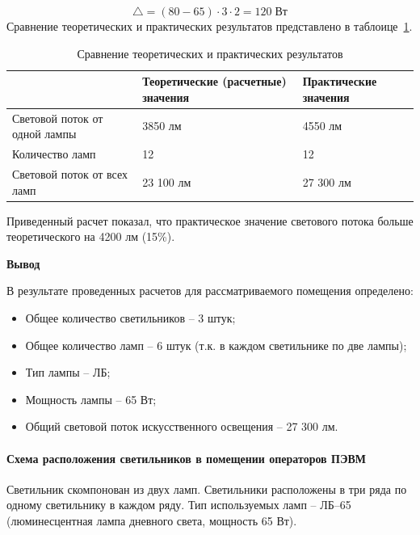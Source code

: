 \begin{enumerate}
$$ \triangle = (80 - 65) \cdot 3 \cdot 2 = 120 \; Вт$$
Сравнение теоретических и практических результатов представлено в таблоице~\ref{bzd:srav}.

 \begin{table}[htbp]
    \centering
    \caption{Сравнение теоретических и практических результатов}\label{bzd:srav}%
      \begin{tabular}{|p{4cm}|p{5cm}|p{5cm}|}
      \hline
       & \textbf{Теоретические (расчетные) значения} & \textbf{Практические значения} \\
      \hline
      Световой поток от одной лампы & 3850 лм & 4550 лм \\
      \hline
      Количество ламп & 12 & 12 \\
      \hline
      Световой поток от всех ламп & 23 100 лм & 27 300 лм \\
      \hline
      \end{tabular}%
    
  \end{table}%
  Приведенный расчет показал, что практическое значение светового потока больше теоретического на 4200 лм (15\%).
\end{enumerate}
 
  \textbf{Вывод}
  
  В результате проведенных расчетов для рассматриваемого помещения определено:
  \begin{itemize}
  \item Общее количество светильников – 3 штук;
  \item Общее количество ламп – 6 штук (т.к. в каждом светильнике по две лампы);
  \item 	Тип лампы – ЛБ;
  \item Мощность лампы – 65 Вт;
  \item Общий световой поток искусственного освещения – 27 300 лм.
  \end{itemize}

\paragraph{Схема расположения светильников в помещении операторов ПЭВМ}

Светильник скомпонован из двух ламп. Светильники расположены в три ряда по одному светильнику в каждом ряду. Тип используемых ламп – ЛБ–65 (люминесцентная лампа дневного света, мощность 65 Вт).

